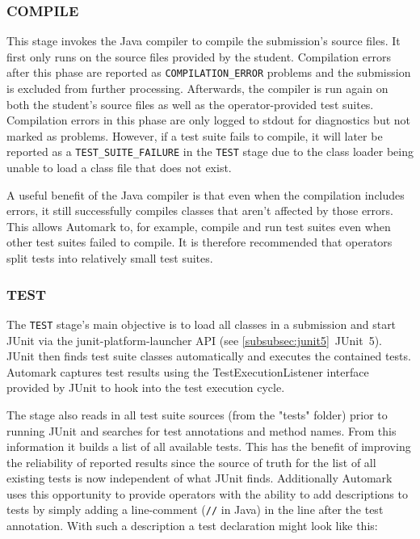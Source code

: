 \documentclass[12pt,a4paper,oneside]{report}
\begin{document}
	\subsubsection{COMPILE}
	This stage invokes the Java compiler to compile the submission's source files. It first only runs on the source files provided by the student. Compilation errors after this phase are reported as \lstinline|COMPILATION_ERROR| problems and the submission is excluded from further processing. Afterwards, the compiler is run again on both the student's source files as well as the operator-provided test suites. Compilation errors in this phase are only logged to stdout for diagnostics but not marked as problems. However, if a test suite fails to compile, it will later be reported as a \lstinline|TEST_SUITE_FAILURE| in the \lstinline|TEST| stage due to the class loader being unable to load a class file that does not exist.

	A useful benefit of the Java compiler is that even when the compilation includes errors, it still successfully compiles classes that aren't affected by those errors. This allows Automark to, for example, compile and run test suites even when other test suites failed to compile. It is therefore recommended that operators split tests into relatively small test suites.

	\subsubsection{TEST}
	The \lstinline|TEST| stage's main objective is to load all classes in a submission and start JUnit via the junit-platform-launcher API (see \ref{subsubsec:junit5}~JUnit~5). JUnit then finds test suite classes automatically and executes the contained tests. Automark captures test results using the TestExecutionListener interface provided by JUnit to hook into the test execution cycle.

	The stage also reads in all test suite sources (from the "tests" folder) prior to running JUnit and searches for test annotations and method names. From this information it builds a list of all available tests. This has the benefit of improving the reliability of reported results since the source of truth for the list of all existing tests is now independent of what JUnit finds. Additionally Automark uses this opportunity to provide operators with the ability to add descriptions to tests by simply adding a line-comment (\lstinline|//| in Java) in the line after the test annotation. With such a description a test declaration might look like this:
\end{document}
